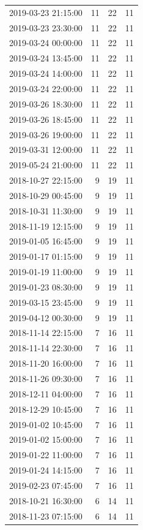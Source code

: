 \begin{tabular}{lrrr}
2019-03-23 21:15:00 & 11 & 22 & 11 \\
2019-03-23 23:30:00 & 11 & 22 & 11 \\
2019-03-24 00:00:00 & 11 & 22 & 11 \\
2019-03-24 13:45:00 & 11 & 22 & 11 \\
2019-03-24 14:00:00 & 11 & 22 & 11 \\
2019-03-24 22:00:00 & 11 & 22 & 11 \\
2019-03-26 18:30:00 & 11 & 22 & 11 \\
2019-03-26 18:45:00 & 11 & 22 & 11 \\
2019-03-26 19:00:00 & 11 & 22 & 11 \\
2019-03-31 12:00:00 & 11 & 22 & 11 \\
2019-05-24 21:00:00 & 11 & 22 & 11 \\
2018-10-27 22:15:00 & 9 & 19 & 11 \\
2018-10-29 00:45:00 & 9 & 19 & 11 \\
2018-10-31 11:30:00 & 9 & 19 & 11 \\
2018-11-19 12:15:00 & 9 & 19 & 11 \\
2019-01-05 16:45:00 & 9 & 19 & 11 \\
2019-01-17 01:15:00 & 9 & 19 & 11 \\
2019-01-19 11:00:00 & 9 & 19 & 11 \\
2019-01-23 08:30:00 & 9 & 19 & 11 \\
2019-03-15 23:45:00 & 9 & 19 & 11 \\
2019-04-12 00:30:00 & 9 & 19 & 11 \\
2018-11-14 22:15:00 & 7 & 16 & 11 \\
2018-11-14 22:30:00 & 7 & 16 & 11 \\
2018-11-20 16:00:00 & 7 & 16 & 11 \\
2018-11-26 09:30:00 & 7 & 16 & 11 \\
2018-12-11 04:00:00 & 7 & 16 & 11 \\
2018-12-29 10:45:00 & 7 & 16 & 11 \\
2019-01-02 10:45:00 & 7 & 16 & 11 \\
2019-01-02 15:00:00 & 7 & 16 & 11 \\
2019-01-22 11:00:00 & 7 & 16 & 11 \\
2019-01-24 14:15:00 & 7 & 16 & 11 \\
2019-02-23 07:45:00 & 7 & 16 & 11 \\
2018-10-21 16:30:00 & 6 & 14 & 11 \\
2018-11-23 07:15:00 & 6 & 14 & 11 \\

\end{tabular}

